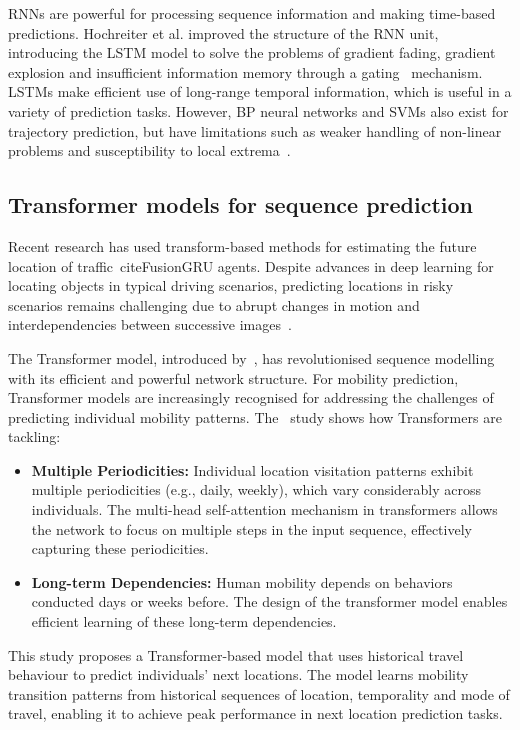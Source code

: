 \documentclass[12pt,oneside]{book} %
\begin{document}
RNNs are powerful for processing sequence information and making time-based
predictions. Hochreiter et al. improved the structure of the RNN unit,
introducing the LSTM model to solve the problems of gradient fading, gradient
explosion and insufficient information memory through a
gating~\cite{WaterShipTrajectoryPrediction} mechanism. LSTMs make efficient use
of long-range temporal information, which is useful in a variety of prediction
tasks. However, BP neural networks and SVMs also exist for trajectory
prediction, but have limitations such as weaker handling of non-linear problems
and susceptibility to local extrema~\cite{WaterShipTrajectoryPrediction}.

\subsection{Transformer models for sequence prediction}
Recent research has used transform-based methods for estimating the future
location of traffic~cite{FusionGRU} agents. Despite advances in deep learning
for locating objects in typical driving scenarios, predicting locations in
risky scenarios remains challenging due to abrupt changes in motion and
interdependencies between successive images~\cite{FusionGRU}.

The Transformer model, introduced by~\citet{Vaswani2017}, has revolutionised
sequence modelling with its efficient and powerful network structure. For
mobility prediction, Transformer models are increasingly recognised for
addressing the challenges of predicting individual mobility patterns.
The~\citet{HowDoUGoWhere} study shows how Transformers are tackling:

\begin{itemize}
    \item \textbf{Multiple Periodicities:} Individual location visitation patterns exhibit multiple periodicities (e.g., daily, weekly), which vary considerably across individuals. The multi-head self-attention mechanism in transformers allows the network to focus on multiple steps in the input sequence, effectively capturing these periodicities.
    \item \textbf{Long-term Dependencies:} Human mobility depends on behaviors conducted days or weeks before. The design of the transformer model enables efficient learning of these long-term dependencies.
\end{itemize}

This study proposes a Transformer-based model that uses historical travel
behaviour to predict individuals' next locations. The model learns mobility
transition patterns from historical sequences of location, temporality and mode
of travel, enabling it to achieve peak performance in next location prediction
tasks.
\end{document}
